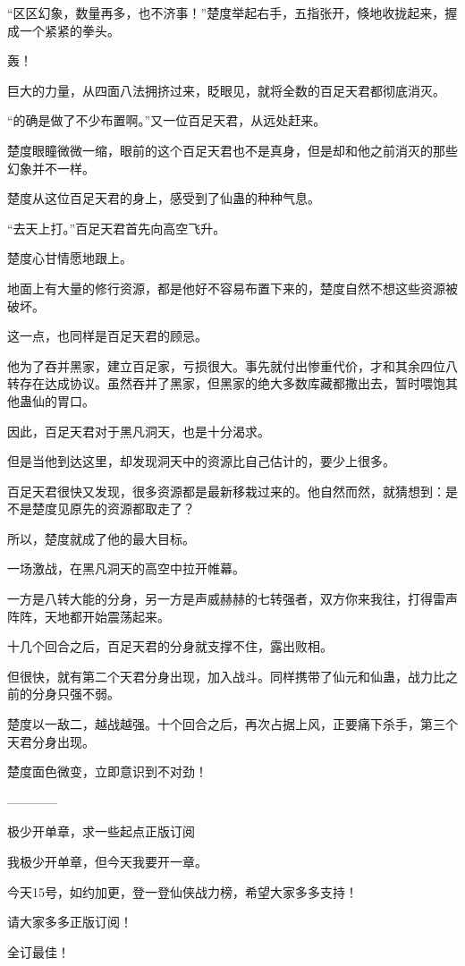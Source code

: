 \begin{this_body}
“区区幻象，数量再多，也不济事！”楚度举起右手，五指张开，倏地收拢起来，握成一个紧紧的拳头。

轰！

巨大的力量，从四面八法拥挤过来，眨眼见，就将全数的百足天君都彻底消灭。

“的确是做了不少布置啊。”又一位百足天君，从远处赶来。

楚度眼瞳微微一缩，眼前的这个百足天君也不是真身，但是却和他之前消灭的那些幻象并不一样。

楚度从这位百足天君的身上，感受到了仙蛊的种种气息。

“去天上打。”百足天君首先向高空飞升。

楚度心甘情愿地跟上。

地面上有大量的修行资源，都是他好不容易布置下来的，楚度自然不想这些资源被破坏。

这一点，也同样是百足天君的顾忌。

他为了吞并黑家，建立百足家，亏损很大。事先就付出惨重代价，才和其余四位八转存在达成协议。虽然吞并了黑家，但黑家的绝大多数库藏都撒出去，暂时喂饱其他蛊仙的胃口。

因此，百足天君对于黑凡洞天，也是十分渴求。

但是当他到达这里，却发现洞天中的资源比自己估计的，要少上很多。

百足天君很快又发现，很多资源都是最新移栽过来的。他自然而然，就猜想到：是不是楚度见原先的资源都取走了？

所以，楚度就成了他的最大目标。

一场激战，在黑凡洞天的高空中拉开帷幕。

一方是八转大能的分身，另一方是声威赫赫的七转强者，双方你来我往，打得雷声阵阵，天地都开始震荡起来。

十几个回合之后，百足天君的分身就支撑不住，露出败相。

但很快，就有第二个天君分身出现，加入战斗。同样携带了仙元和仙蛊，战力比之前的分身只强不弱。

楚度以一敌二，越战越强。十个回合之后，再次占据上风，正要痛下杀手，第三个天君分身出现。

楚度面色微变，立即意识到不对劲！

------------

极少开单章，求一些起点正版订阅

我极少开单章，但今天我要开一章。

今天15号，如约加更，登一登仙侠战力榜，希望大家多多支持！

请大家多多正版订阅！

全订最佳！


\end{this_body}
